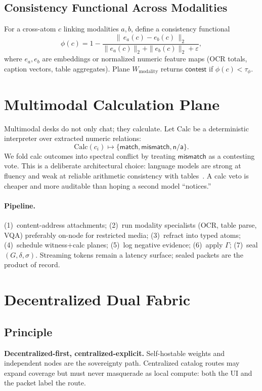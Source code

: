 \documentclass[journal,10pt,twocolumn,a4paper]{IEEEtran}
\begin{document}
\subsection{Consistency Functional Across Modalities}
For a cross-atom $c$ linking modalities $a,b$, define a consistency functional
\begin{equation}
\label{eq:cons}
\phi(c)=1-\frac{\|\,e_a(c)-e_b(c)\,\|_2}{\|e_a(c)\|_2+\|e_b(c)\|_2+\varepsilon},
\end{equation}
where $e_a,e_b$ are embeddings or normalized numeric feature maps (OCR totals, caption vectors, table aggregates).
Plane $W_{\mathrm{modality}}$ returns $\mathsf{contest}$ if $\phi(c)<\tau_\phi$.

\section{Multimodal Calculation Plane}
\label{sec:multi}

Multimodal desks do not only chat; they calculate.
Let $\mathrm{Calc}$ be a deterministic interpreter over extracted numeric relations:
\begin{equation}
\mathrm{Calc}(c_i)\mapsto\{\mathsf{match},\mathsf{mismatch},\mathsf{n/a}\}.
\end{equation}
We fold calc outcomes into spectral conflict by treating $\mathsf{mismatch}$ as a contesting vote.
This is a deliberate architectural choice: language models are strong at fluency and weak at reliable arithmetic consistency with tables~\cite{bender2021stochastic,openai2023gpt4}.
A calc veto is cheaper and more auditable than hoping a second model ``notices.''

\paragraph{Pipeline.}
(1)~content-address attachments;
(2)~run modality specialists (OCR, table parse, VQA) preferably on-node for restricted media;
(3)~refract into typed atoms;
(4)~schedule witness+calc planes;
(5)~log negative evidence;
(6)~apply $\Gamma$;
(7)~seal $(G,\delta,\sigma)$.
Streaming tokens remain a latency surface; sealed packets are the product of record.

\section{Decentralized Dual Fabric}
\label{sec:decentral}

\subsection{Principle}
\textbf{Decentralized-first, centralized-explicit.}
Self-hostable weights and independent nodes are the sovereignty path.
Centralized catalog routes may expand coverage but must never masquerade as local compute: both the UI and the packet label the route.
\end{document}
